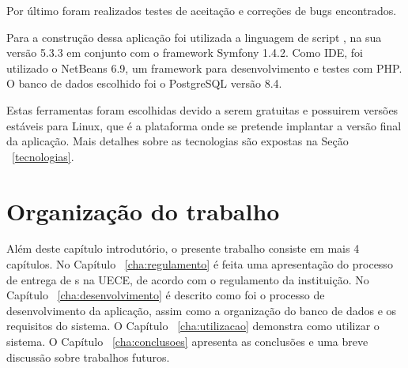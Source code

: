 Por último foram realizados testes de aceitação e correções de bugs encontrados.

Para a construção dessa aplicação foi utilizada a linguagem de script , na 
sua versão 5.3.3 em conjunto com o framework Symfony 1.4.2. Como IDE, foi utilizado 
o NetBeans 6.9, um framework para desenvolvimento e testes com PHP. O 
banco de dados escolhido foi o PostgreSQL versão 8.4.

Estas ferramentas foram escolhidas devido a serem gratuitas e possuirem versões 
estáveis para Linux, que é a plataforma onde se pretende implantar a versão 
final da aplicação. Mais detalhes sobre as tecnologias são expostas na Seção ~\ref{tecnologias}.

\section{Organização do trabalho}

Além deste capítulo introdutório, o presente trabalho consiste em mais 4 capítulos. 
No Capítulo ~\ref{cha:regulamento} é feita uma apresentação do processo de 
entrega de s na UECE, de acordo
com o regulamento da instituição. No Capítulo ~\ref{cha:desenvolvimento} é descrito como foi o processo de desenvolvimento 
da aplicação, assim como a organização do banco de dados e os requisitos do sistema. 
O Capítulo ~\ref{cha:utilizacao} demonstra como utilizar o sistema. O Capítulo ~\ref{cha:conclusoes} apresenta as conclusões
e uma breve discussão sobre trabalhos futuros.


